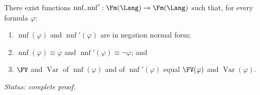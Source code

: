 \begin{lemma}
\label{lem:fol-nnf}
There exist functions
\(\operatorname{nnf},\operatorname{nnf}':\Fm(\Lang)\to\Fm(\Lang)\) such
that, for every formula \(\varphi\):
\begin{enumerate}
  \item \(\operatorname{nnf}(\varphi)\) and \(\operatorname{nnf}'(\varphi)\)
        are in negation normal form;
  \item \(\operatorname{nnf}(\varphi)\equiv\varphi\) and
        \(\operatorname{nnf}'(\varphi)\equiv\neg\varphi\); and
  \item \(\FV\) and \(\operatorname{Var}\) of
        \(\operatorname{nnf}(\varphi)\) and of
        \(\operatorname{nnf}'(\varphi)\) equal \(\FV(\varphi)\) and
        \(\operatorname{Var}(\varphi)\).
\end{enumerate}
\textit{Status: complete proof.}
\end{lemma}
